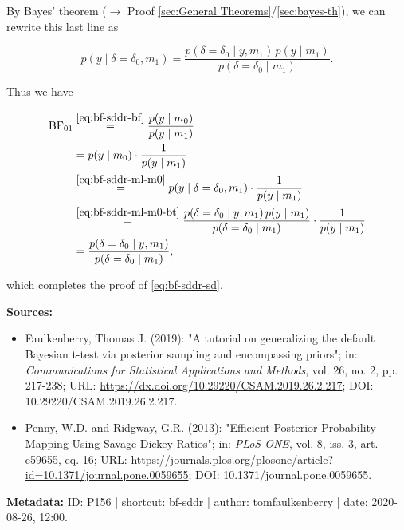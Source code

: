 \documentclass[a4paper,12pt,twoside]{book}
\begin{document}
By Bayes' theorem ($\rightarrow$ Proof \ref{sec:General Theorems}/\ref{sec:bayes-th}), we can rewrite this last line as

\begin{equation} \label{eq:bf-sddr-ml-m0-bt}
p(y \mid \delta=\delta_0,m_1) = \frac{p(\delta=\delta_0\mid y,m_1) \, p(y \mid m_1)}{p(\delta=\delta_0\mid m_1)}.
\end{equation}

Thus we have

\begin{equation} 
\begin{split}
  \text{BF}_{01} &\overset{\eqref{eq:bf-sddr-bf}}{=} \frac{p(y \mid m_0)}{p(y \mid m_1)}\\
  &= p(y \mid m_0) \cdot \frac{1}{p(y \mid m_1)}\\
  &\overset{\eqref{eq:bf-sddr-ml-m0}}{=} p(y \mid \delta=\delta_0,m_1) \cdot \frac{1}{p(y \mid m_1)}\\
  &\overset{\eqref{eq:bf-sddr-ml-m0-bt}}{=} \frac{p(\delta=\delta_0\mid y,m_1) \, p(y \mid m_1)}{p(\delta=\delta_0\mid m_1)} \cdot \frac{1}{p(y \mid m_1)}\\
  &= \frac{p(\delta=\delta_0 \mid y,m_1)}{p(\delta=\delta_0\mid m_1)},
\end{split}
\end{equation}

which completes the proof of \eqref{eq:bf-sddr-sd}.


\vspace{1em}
\textbf{Sources:}
\begin{itemize}
\item Faulkenberry, Thomas J. (2019): "A tutorial on generalizing the default Bayesian t-test via posterior sampling and encompassing priors"; in: \textit{Communications for Statistical Applications and Methods}, vol. 26, no. 2, pp. 217-238; URL: \url{https://dx.doi.org/10.29220/CSAM.2019.26.2.217}; DOI: 10.29220/CSAM.2019.26.2.217.
\item Penny, W.D. and Ridgway, G.R. (2013): "Efficient Posterior Probability Mapping Using Savage-Dickey Ratios"; in: \textit{PLoS ONE}, vol. 8, iss. 3, art. e59655, eq. 16; URL: \url{https://journals.plos.org/plosone/article?id=10.1371/journal.pone.0059655}; DOI: 10.1371/journal.pone.0059655.
\end{itemize}


\vspace{1em}
\textbf{Metadata:} ID: P156 | shortcut: bf-sddr | author: tomfaulkenberry | date: 2020-08-26, 12:00.
\vspace{1em}
\end{document}
